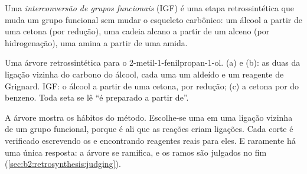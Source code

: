 \begin{definition}\label{def:b2:retrosynthesis:fgi}
Uma \emph{interconversão de grupos funcionais} (IGF) é uma
etapa retrossintética que muda um grupo funcional sem mudar o esqueleto carbônico: um álcool a partir
de uma cetona (por redução), uma cadeia alcano a partir de um alceno (por hidrogenação), uma amina a
partir de uma amida.
\end{definition}

\begin{omfigure}
\par\vspace{6pt}

{\small Uma árvore retrossintética para o 2-metil-1-fenilpropan-1-ol. (a) e (b): as duas 
da ligação  vizinha do carbono do álcool, cada uma um aldeído e um reagente de Grignard. IGF: o
álcool a partir de uma cetona, por redução; (c) a cetona por  do benzeno.
Toda seta se lê ``é preparado a partir de''.}
\end{omfigure}

A árvore mostra os hábitos do método. Escolhe-se uma  em uma ligação vizinha de um grupo
funcional, porque é ali que as reações criam ligações. Cada corte é verificado escrevendo os  e
encontrando reagentes reais para eles. E raramente há uma única resposta: a árvore se ramifica, e os
ramos são julgados no fim (\cref{sec:b2:retrosynthesis:judging}).

